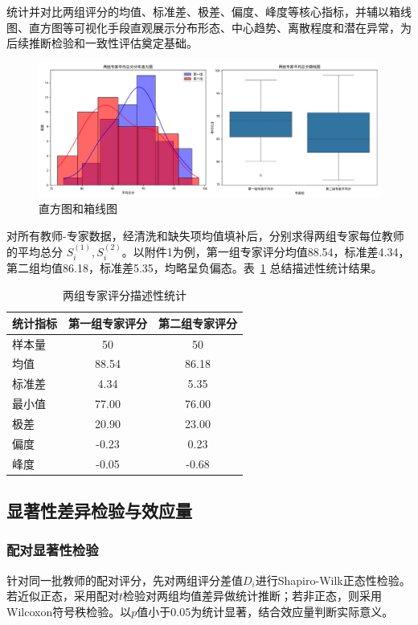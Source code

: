 统计并对比两组评分的均值、标准差、极差、偏度、峰度等核心指标，并辅以箱线图、直方图等可视化手段直观展示分布形态、中心趋势、离散程度和潜在异常，为后续推断检验和一致性评估奠定基础。

\begin{figure}[htbp]
    \centering
    \includegraphics[width=1\textwidth]{descriptive_statistics.png} %
    \caption{直方图和箱线图}
\end{figure}



对所有教师-专家数据，经清洗和缺失项均值填补后，分别求得两组专家每位教师的平均总分 $S^{(1)}_i, S^{(2)}_i$。以附件1为例，第一组专家评分均值88.54，标准差4.34，第二组均值86.18，标准差5.35，均略呈负偏态。表~\ref{tab:descstat} 总结描述性统计结果。



\begin{table}[h]
\centering
\caption{两组专家评分描述性统计}
\label{tab:descstat}
\begin{tabular}{lcc}
\toprule
统计指标 & 第一组专家评分 & 第二组专家评分 \\
\midrule
样本量      & 50        & 50        \\
均值        & 88.54     & 86.18     \\
标准差      & 4.34      & 5.35      \\
最小值      & 77.00     & 76.00     \\
极差        & 20.90     & 23.00     \\
偏度        & -0.23     & 0.23      \\
峰度        & -0.05     & -0.68     \\
\bottomrule
\end{tabular}
\end{table}

\subsection{显著性差异检验与效应量}
\subsubsection{配对显著性检验}
针对同一批教师的配对评分，先对两组评分差值$D_i$进行Shapiro-Wilk正态性检验。若近似正态，采用配对$t$检验对两组均值差异做统计推断；若非正态，则采用Wilcoxon符号秩检验。以$p$值小于0.05为统计显著，结合效应量判断实际意义。

